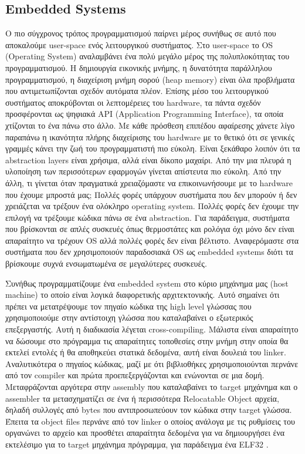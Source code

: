 \subsection{Embedded Systems}

Ο πιο σύγχρονος τρόπος προγραμματισμού παίρνει μέρος συνήθως σε αυτό
που αποκαλούμε user-space ενός λειτουργικού συστήματος.  Στο
user-space το OS (Operating System) αναλαμβάνει ένα πολύ μεγάλο μέρος
της πολυπλοκότητας του προγραμματισμού. Η δημιουργία εικονικής μνήμης,
η δυνατότητα παράλληλου προγραμματισμού, η διαχείριση μνήμη σορού
(heap memory) είναι όλα προβλήματα που αντιμετωπίζονται σχεδόν
αυτόματα πλέον. Επίσης μέσο του λειτουργικού συστήματος αποκρύβονται
οι λεπτομέρειες του hardware, τα πάντα σχεδόν προσφέρονται ως ψηφιακά
API (Application Programming Interface), τα οποία χτίζονται το ένα
πάνω στο άλλο.  Με κάθε πρόσθεση επιπέδου αφαίρεσης χάνετε λίγο
παραπάνω η ικανότητα πλήρης διαχείρισης του hardware με το θετικό ότι
σε γενικές γραμμές κάνει την ζωή του προγραμματιστή πιο εύκολη. Είναι
ξεκάθαρο λοιπόν ότι τα abstraction layers είναι χρήσιμα, αλλά είναι
δίκοπο μαχαίρι. Από την μια πλευρά η υλοποίηση των περισσότερων
εφαρμογών γίνεται απίστευτα πιο εύκολη. Από την άλλη, τι γίνεται όταν
πραγματικά χρειαζόμαστε να επικοινωνήσουμε με το hardware που έχουμε
μπροστά μας;
Πολλές φορές υπάρχουν συστήματα που δεν μπορούν ή δεν χρειάζεται
να τρέξουν ένα ολόκληρο operating system. Πολλές φορές δεν έχουμε την
επιλογή να τρέξουμε κώδικα πάνω σε ένα abstraction. Για παράδειγμα,
συστήματα που βρίσκονται σε απλές συσκευές όπως θερμοστάτες και
ρολόγια όχι μόνο δεν είναι απαραίτητο να τρέχουν OS αλλά πολλές φορές
δεν είναι βέλτιστο. 
Αναφερόμαστε στα συστήματα που δεν χρησιμοποιούν παραδοσιακά OS  ως
embedded systems διότι τα βρίσκουμε συχνά ενσωματωμένα σε μεγαλύτερες συσκευές.

Συνήθως προγραμματίζουμε ένα embedded system στο κύριο μηχάνημα μας
(host machine) το οποίο είναι λογικά διαφορετικής αρχιτεκτονικής. Αυτό
σημαίνει ότι πρέπει να μετατρέψουμε τον πηγαίο κώδικα της high level
γλώσσας που χρησιμοποιούμε στην αντίστοιχη γλώσσα που καταλαβαίνει ο
εξωτερικός επεξεργαστής. Αυτή η διαδικασία λέγεται
cross-compiling. Μάλιστα είναι απαραίτητο να δώσουμε στο πρόγραμμα τις
απαραίτητες τοποθεσίες στην μνήμη στην οποία θα εκτελεί εντολές ή θα
αποθηκεύει στατικά δεδομένα, αυτή είναι δουλειά του
linker. Αναλυτικότερα ο πηγαίος κώδικας, μαζί
με ότι βιβλιοθήκες χρησιμοποιούνται περνάνε από τον compiler και
πρώτα προεπεξεργάζονται και ενώνονται σε μια δομή.
Μεταφράζονται αργότερα στην assembly που καταλαβαίνει το target
μηχάνημα και ο assembler τα μετασχηματίζει σε ένα ή περισσότερα
Relocatable Object αρχεία, δηλαδή συλλογές από bytes που
αντιπροσωπεύουν τον κώδικα στην target γλώσσα. Έπειτα τα object files
περνάνε από τον linker ο οποίος ανάλογα με τις ρυθμίσεις του οργανώνει
το αρχείο και προσθέτει απαραίτητα δεδομένα για να δημιουργήσει ένα
εκτελέσιμο για το target μηχάνημα πρόγραμμα, για παράδειγμα ένα ELF32 .

